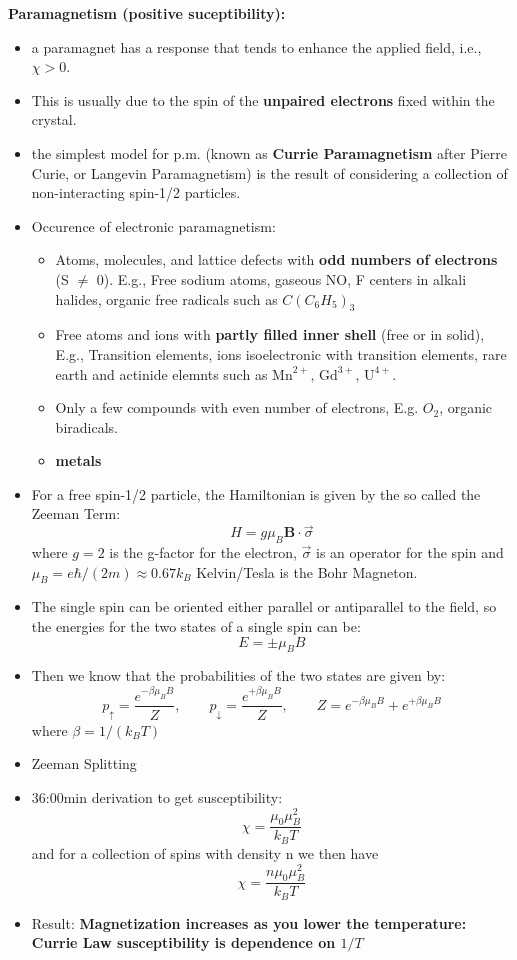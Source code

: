 \textbf{Paramagnetism (positive suceptibility):}
\begin{itemize}
    \item a paramagnet has a response that tends to enhance the applied field, i.e., \textbf{$\chi > 0.$}
    \item This is usually due to the spin of the \textbf{unpaired electrons} fixed within the crystal.
    \item the simplest model for p.m. (known as \textbf{Currie Paramagnetism} after Pierre Curie, or Langevin Paramagnetism) is the result of considering a collection of non-interacting spin-1/2 particles.
    \item Occurence of electronic paramagnetism:
    \begin{itemize}
        \item Atoms, molecules, and lattice defects with \textbf{odd numbers of electrons} (S $\neq$ 0).
        E.g., Free sodium atoms, gaseous NO, F centers in alkali halides, organic free radicals such as $C(C_6H_5)_3$
        \item Free atoms and ions with \textbf{partly filled inner shell} (free or in solid), E.g., Transition elements, ions isoelectronic with transition elements, rare earth and actinide elemnts such as $\text{Mn}^{2+}\text{, Gd}^{3+}\text{, U}^{4+}.$
        \item Only a few compounds with even number of electrons, E.g. $O_2$, organic biradicals.
        \item \textbf{metals}
    \end{itemize}
    \item For a free spin-1/2 particle, the Hamiltonian is given by the so called the Zeeman Term:
    \[ H = g \mu_B \textbf{B}\cdot \vec{\sigma} \]
    where $g=2$ is the g-factor for the electron, $\vec{\sigma}$ is an operator for the spin and $\mu_B = e\hbar/(2m) \approx 0.67k_B $ Kelvin/Tesla is the Bohr Magneton.
    \item The single spin can be oriented either parallel or antiparallel to the field, so the energies for the two states of a single spin can be:
    \[ E = \pm \mu_B B \]
    \item Then we know that the probabilities of the two states are given by:
    \[p_{\uparrow} = \frac{e^{-\beta \mu_B B}}{Z}, \qquad  p_{\downarrow} = \frac{e^{+\beta \mu_B B}}{Z}, \qquad Z = e^{-\beta \mu_B B}+ e^{+\beta \mu_B B}\]
    where $\beta = 1/(k_B T) $
    \item Zeeman Splitting
    \item 36:00min derivation to get susceptibility:
    \[ \chi = \frac{\mu_0 \mu_B^2}{k_B T}\]
    and for a collection of spins with density n we then have 
    \[\chi = \frac{n \mu_0 \mu_B^2}{k_B T} \]
    \item Result: \textbf{Magnetization increases as you lower the temperature: Currie Law susceptibility is dependence on $1/T$}
\end{itemize}

